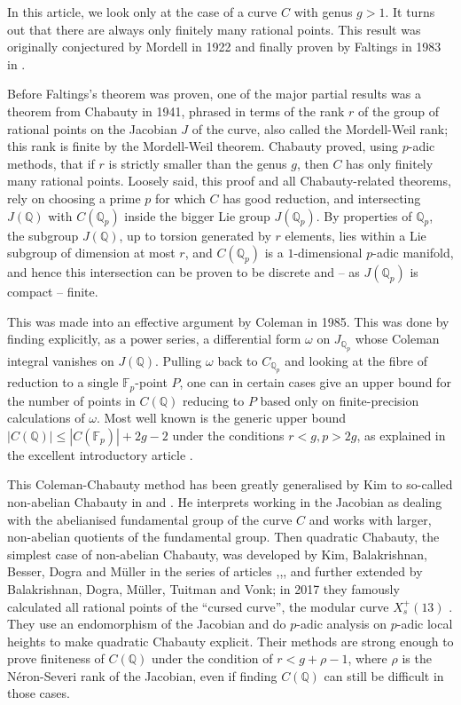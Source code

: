 \documentclass[12pt]{article}
\newcommand{\Q}{\mathbb{Q}}
\newcommand{\F}{\mathbb{F}}
\theoremstyle{plain}
\theoremstyle{definition}
\theoremstyle{remark}
\begin{document}
In this article, we look only at the case of a curve $C$ with genus $g > 1$. It turns out that there are always only finitely many rational points. This result was originally conjectured by Mordell in 1922 and finally proven by Faltings in 1983 in \cite{faltings}.

Before Faltings's theorem was proven, one of the major partial results was a theorem from Chabauty in 1941, phrased in terms of the rank $r$ of the group of rational points on the Jacobian $J$ of the curve, also called the Mordell-Weil rank; this rank is finite by the Mordell-Weil theorem. Chabauty proved, using $p$-adic methods, that if $r$ is strictly smaller than the genus $g$, then $C$ has only finitely many rational points. Loosely said, this proof and all Chabauty-related theorems, rely on choosing a prime $p$ for which $C$ has good reduction, and intersecting $J(\Q)$ with $C(\Q_p)$ inside the bigger Lie group $J(\Q_p)$. By properties of $\Q_p$, the subgroup $J(\Q)$, up to torsion generated by $r$ elements, lies within a Lie subgroup of dimension at most $r$, and $C(\Q_p)$ is a $1$-dimensional $p$-adic manifold, and hence this intersection can be proven to be discrete and -- as $J(\Q_p)$ is compact -- finite.

This was made into an effective argument by Coleman in 1985. This was done by finding explicitly, as a power series, a differential form $\omega$ on $J_{\Q_p}$ whose Coleman integral vanishes on $J(\Q)$. Pulling $\omega$ back to $C_{\Q_p}$ and looking at the fibre of reduction to a single $\F_p$-point $P$, one can in certain cases give an upper bound for the number of points in $C(\Q)$ reducing to $P$ based only on finite-precision calculations of $\omega$. Most well known is the generic upper bound $|C(\Q)| \leq |C(\F_p)| + 2g-2$ under the conditions $r < g, p > 2g$, as explained in the excellent introductory article \cite{poonen12}.

This Coleman-Chabauty method has been greatly generalised by Kim to so-called non-abelian Chabauty in \cite{kim1} and \cite{kim2}. He interprets working in the Jacobian as dealing with the abelianised fundamental group of the curve $C$ and works with larger, non-abelian quotients of the fundamental group. Then quadratic Chabauty, the simplest case of non-abelian Chabauty, was developed by Kim, Balakrishnan, Besser, Dogra and M\"uller in the series of articles \cite{qc1},\cite{qc2},\cite{qc3}, and further extended by Balakrishnan, Dogra, M\"uller, Tuitman and Vonk; in 2017 they famously calculated all rational points of the ``cursed curve'', the modular curve $X_s^+(13)$ \cite{cursedcurve}. They use an endomorphism of the Jacobian and do $p$-adic analysis on $p$-adic local heights to make quadratic Chabauty explicit. Their methods are strong enough to prove finiteness of $C(\Q)$ under the condition of $r < g + \rho - 1$, where $\rho$ is the N\'eron-Severi rank of the Jacobian, even if finding $C(\Q)$ can still be difficult in those cases.
\end{document}
